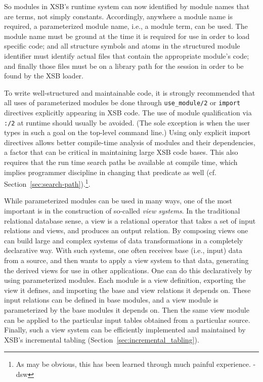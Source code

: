 So modules in XSB's runtime system can now identified by module names
that are terms, not simply constants. Accordingly, anywhere a module
name is required, a parameterized module name, i.e., a module term,
can be used.  The module name must be ground at the time it is
required for use in order to load specific code; and all structure
symbols and atoms in the structured module identifier must identify
actual files that contain the appropriate module's code; and finally
those files must be on a library path for the session in order to be
found by the XSB loader.

To write well-structured and maintainable code, it is strongly
recommended that all uses of parameterized modules be done through
{\tt use\_module/2} or {\tt import} directives explicitly appearing in
XSB code.  The use of module qualification via {\tt :/2} at runtime
should usually be avoided.  (The sole exception is when the user types
in such a goal on the top-level command line.)  Using only explicit
import directives allows better compile-time analysis of modules and
their dependencies, a factor that can be critical in maintaining large
XSB code bases. This also requires that the run time search paths be
available at compile time, which implies programmer discipline in
changing that predicate as well
(cf. Section~\ref{sec:search-path}).\footnote{As may be obvious, this
  has been learned through much painful experience. -dsw}.

While parameterized modules can be used in many ways, one of the most
important is in the construction of so-called {\em view systems}.  In
the traditional relational database sense, a view is a relational
operator that takes a set of input relations and views, and produces
an output relation.  By composing views one can build large and
complex systems of data transformations in a completely declarative
way.  With such systems, one often receives base (i.e., input) data
from a source, and then wants to apply a view system to that data,
generating the derived views for use in other applications.  One can
do this declaratively by using parameterized modules.  Each module is
a view definition, exporting the view it defines, and importing the
base and view relations it depends on.  These input relations can be
defined in base modules, and a view module is parameterized by the
base modules it depends on.  Then the same view module can be applied
to the particular input tables obtained from a particular source.
Finally, such a view system can be efficiently implemented and
maintained by XSB's incremental tabling
(Section~\ref{sec:incremental_tabling}).


